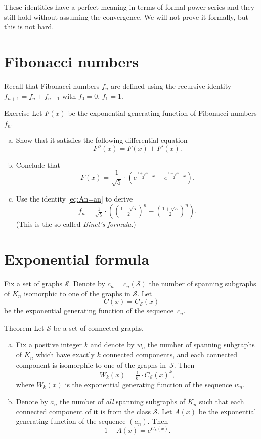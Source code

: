 These identities have a perfect meaning in terms of formal power series
and they still hold without assuming the convergence.
We will not prove it formally, but this is not hard.

\section*{Fibonacci numbers}

Recall that Fibonacci numbers $f_n$ are defined using the recursive identity 
$f_{n+1}=f_n+f_{n-1}$
with $f_0=0$, $f_1=1$.

\begin{thm}{Exercise}
Let $F(x)$ be the exponential generating function of Fibonacci numbers $f_n$.
\begin{enumerate}[(a)]
\item Show that it satisfies the following differential equation
\[F''(x)=F(x)+F'(x).\]
\item Conclude that 
\[F(x)=\frac{1}{\sqrt5}\cdot\left(e^{\frac{1+\sqrt{5}}{2}\cdot x}- e^{\frac{1-\sqrt{5}}{2}\cdot x}\right).\]
\item Use the identity \ref{eq:An=an} to derive 
\[f_n=\tfrac{1}{\sqrt5}\cdot\left((\tfrac{1+\sqrt{5}}{2})^n-(\tfrac{1+\sqrt{5}}{2})^n\right).\]
(This is the so called \emph{Binet's formula}.) 
\end{enumerate}

\end{thm}


\section*{Exponential formula}

Fix a set of graphs $\mathcal{S}$.
Denote by $c_n=c_n(\mathcal{S})$ the number of spanning subgraphs of $K_n$ isomorphic to one of the graphs in $\mathcal{S}$. 
Let \[C(x)=C_{\mathcal{S}}(x)\] be the exponential generating function of the sequence~$c_n$. 


\begin{thm}{Theorem}\label{thm:exp-formula}
Let $\mathcal{S}$ be a set of connected graphs. 

\begin{enumerate}[(a)]
\item\label{thm:exp-formula:Wk} Fix a positive integer $k$ and denote by $w_n$ the number of spanning subgraphs of $K_n$ which have exactly $k$ connected components, and each connected component is  isomorphic to one of the graphs in~$\mathcal{S}$.
Then
\[W_k(x)=\tfrac1{k!}\cdot C_{\mathcal{S}}(x)^k,\]
where $W_k(x)$ is the exponential generating function of the sequence $w_n$.

\item\label{thm:exp-formula:all} Denote by $a_n$ the number of {}\emph{all} spanning subgraphs of $K_n$ such that each connected component of it is from the class $\mathcal{S}$.
Let $A(x)$ be the exponential generating function of the sequence $(a_n)$.
Then
\[1+A(x)=e^{C_{\mathcal{S}}(x)}.\]
\end{enumerate}

\end{thm}

